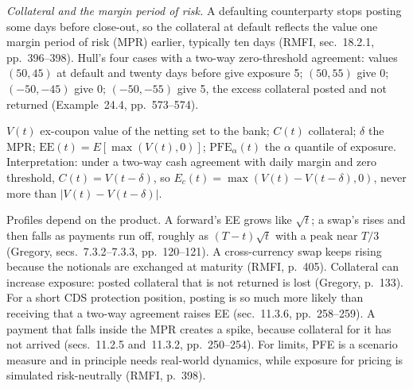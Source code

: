 \begin{qfdefinition}
\emph{Collateral and the margin period of risk.} A defaulting counterparty stops posting some days before close-out, so the collateral at default reflects the value one margin period of risk (MPR) earlier, typically ten days (RMFI, sec.~18.2.1, pp.~396--398). Hull's four cases with a two-way zero-threshold agreement: values $(50,45)$ at default and twenty days before give exposure 5; $(50,55)$ give 0; $(-50,-45)$ give 0; $(-50,-55)$ give 5, the excess collateral posted and not returned (Example~24.4, pp.~573--574).

 $V(t)$ ex-coupon value of the netting set to the bank; $C(t)$ collateral; $\delta$ the MPR; $\mathrm{EE}(t)=E[\max(V(t),0)]$; $\mathrm{PFE}_\alpha(t)$ the $\alpha$ quantile of exposure. Interpretation: under a two-way cash agreement with daily margin and zero threshold, $C(t)=V(t-\delta)$, so $E_c(t)=\max(V(t)-V(t-\delta),0)$, never more than $|V(t)-V(t-\delta)|$.

 Profiles depend on the product. A forward's EE grows like $\sqrt t$; a swap's rises and then falls as payments run off, roughly as $(T-t)\sqrt t$ with a peak near $T/3$ (Gregory, secs.~7.3.2--7.3.3, pp.~120--121). A cross-currency swap keeps rising because the notionals are exchanged at maturity (RMFI, p.~405). Collateral can increase exposure: posted collateral that is not returned is lost (Gregory, p.~133). For a short CDS protection position, posting is so much more likely than receiving that a two-way agreement raises EE (sec.~11.3.6, pp.~258--259). A payment that falls inside the MPR creates a spike, because collateral for it has not arrived (secs.~11.2.5 and~11.3.2, pp.~250--254). For limits, PFE is a scenario measure and in principle needs real-world dynamics, while exposure for pricing is simulated risk-neutrally (RMFI, p.~398).


\end{qfdefinition}
